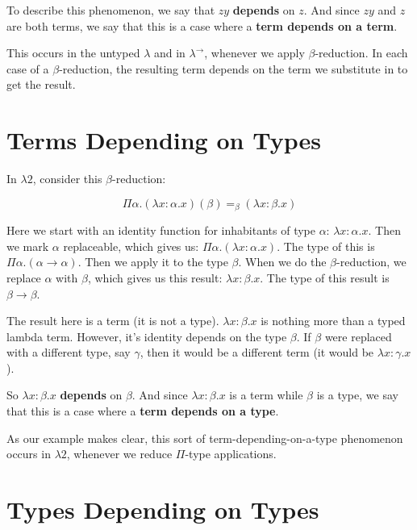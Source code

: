 \documentclass{book}
\numberwithin{equation}{chapter}
\newcommand{\vocab}{\textbf}
\begin{document}
To describe this phenomenon, we say that $zy$ \vocab{depends} on $z$. And since $zy$ and $z$ are both terms, we say that this is a case where a \vocab{term depends on a term}.

This occurs in the untyped $\lambda$ and in $\lambda^{\rightarrow}$, whenever we apply $\beta$-reduction. In each case of a $\beta$-reduction, the resulting term depends on the term we substitute in to get the result.


\section{Terms Depending on Types}

In $\lambda2$, consider this $\beta$-reduction:

\begin{equation}
\Pi \alpha.(\lambda x : \alpha.x)(\beta) =_{\beta} (\lambda x : \beta.x)
\end{equation}

\noindent
Here we start with an identity function for inhabitants of type $\alpha$: $\lambda x : \alpha.x$. Then we mark $\alpha$ replaceable, which gives us: $\Pi \alpha.(\lambda x : \alpha.x)$. The type of this is $\Pi \alpha.(\alpha \rightarrow \alpha)$. Then we apply it to the type $\beta$. When we do the $\beta$-reduction, we replace $\alpha$ with $\beta$, which gives us this result: $\lambda x : \beta.x$. The type of this result is $\beta \rightarrow \beta$.

The result here is a term (it is not a type). $\lambda x : \beta.x$ is nothing more than a typed lambda term. However, it's identity depends on the type $\beta$. If $\beta$ were replaced with a different type, say $\gamma$, then it would be a different term (it would be $\lambda x : \gamma.x$).

So $\lambda x : \beta.x$ \vocab{depends} on $\beta$. And since $\lambda x : \beta.x$ is a term while $\beta$ is a type, we say that this is a case where a \vocab{term depends on a type}.

As our example makes clear, this sort of term-depending-on-a-type phenomenon occurs in $\lambda 2$, whenever we reduce $\Pi$-type applications.


\section{Types Depending on Types}
\end{document}

